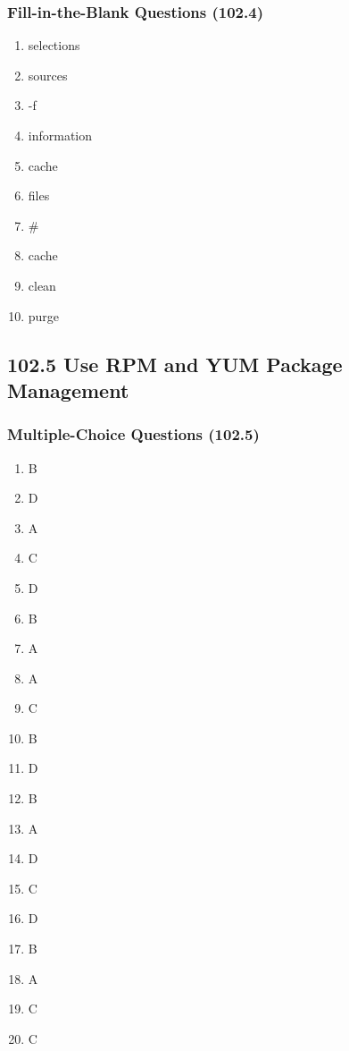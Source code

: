 \documentclass[a4paper]{report}
\begin{document}
\subsubsection*{Fill-in-the-Blank Questions (102.4)}
\begin{enumerate}[1.]
\item selections
\item sources
\item -f
\item information
\item cache
\item files
\item \#
\item cache
\item clean
\item purge
\end{enumerate}
\subsection*{102.5 Use RPM and YUM Package Management}
\subsubsection*{Multiple-Choice Questions (102.5)}
\begin{enumerate}[1.]
    \item B
    \item D
    \item A
    \item C
    \item D
    \item B
    \item A
    \item A
    \item C
    \item B
    \item D
    \item B
    \item A
    \item D
    \item C
    \item D
    \item B
    \item A
    \item C
    \item C
\end{enumerate}
\end{document}

